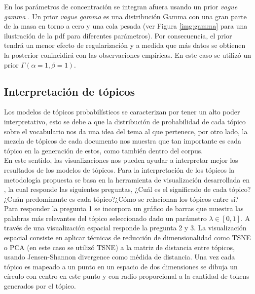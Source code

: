En \citep{teh2005sharing} los parámetros de concentración se integran afuera usando un prior \textit{vague gamma} \citep{escobar1995bayesian}. Un prior \textit{vague gamma} es una distribución Gamma con una gran parte de la masa en torno a cero y una cola pesada (ver Figura \ref{img:gamma} para una ilustración de la pdf para diferentes parámetros). Por consecuencia, el prior tendrá un menor efecto de regularización y a medida que más datos se obtienen la posterior conincidirá con las observaciones empíricas. En este caso se utilizó un prior $\Gamma(\alpha=1, \beta=1)$.

\subsection{Interpretación de tópicos}

Los modelos de tópicos probabilísticos se caracterizan por tener un alto poder interpretativo, esto se debe a que la distribución de probabilidad de cada tópico sobre el vocabulario nos da una idea del tema al que pertenece, por otro lado, la mezcla de tópicos de cada documento nos muestra que tan importante es cada tópico en la generación de estos, como también dentro del corpus. \\

En este sentido, las visualizaciones nos pueden ayudar a interpretar mejor los resultados de los modelos de tópicos. Para la interpretación de los tópicos la metodología propuesta se basa en la herramienta de visualización desarrollada en  \citep{sievert2014ldavis}, la cual responde las siguientes preguntas, ¿Cuál es el significado de cada tópico?¿Cuán predominante es cada tópico?¿Cómo se relacionan los tópicos entre sí?\\

Para responder la pregunta 1 se incorpora un gráfico de barras que muestra las palabras más relevantes del tópico seleccionado dado un parámetro $\lambda \in [0,1]$. A través de una visualización espacial responde la pregunta 2 y 3. La visualización espacial consiste en aplicar técnicas de reducción de dimensionalidad como TSNE \citep{maaten2008visualizing} o PCA \citep{wold1987principal} (en este caso se utilizó TSNE) a la matriz de distancia entre tópicos, usando Jensen-Shannon divergence \citep{endres2003new} como médida de distancia. Una vez cada tópico es mapeado a un punto en un espacio de dos dimensiones se dibuja un círculo con centro en este punto y con radio proporcional a la cantidad de tokens generados por el tópico.\\

